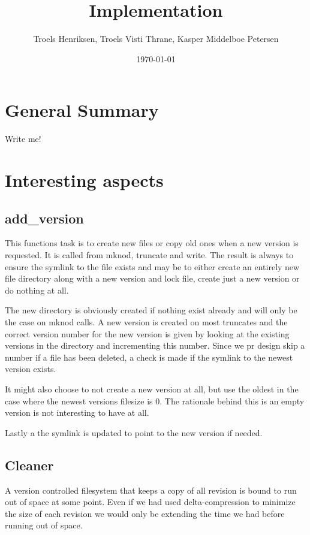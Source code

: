 \documentclass[12pt]{article}
\author{
        Troels Henriksen, Troels Visti Thrane, Kasper Middelboe Petersen
}
\date{\today}
\title{Implementation}
\begin{document}
 
\maketitle

\section{General Summary}
Write me!

\section{Interesting aspects}

\subsection{add\_version}

This functions task is to create new files or copy old ones when a new
version is requested. It is called from mknod, truncate and write. The
result is always to ensure the symlink to the file exists and may be
to either create an entirely new file directory along with a new
version and lock file, create just a new version or do nothing at all.

The new directory is obviously created if nothing exist already and
will only be the case on mknod calls. A new version is created on most
truncates and the correct version number for the new version is given
by looking at the existing versions in the directory and incrementing
this number. Since we pr design skip a number if a file has been
deleted, a check is made if the symlink to the newest version exists.

It might also choose to not create a new version at all, but use the
oldest in the case where the newest versions filesize is 0. The
rationale behind this is an empty version is not interesting to have
at all.

Lastly a the symlink is updated to point to the new version if needed.

\subsection{Cleaner}

A version controlled filesystem that keeps a copy of all revision is bound to
run out of space at some point. Even if we had used delta-compression to
minimize the size of each revision we would only be extending the time we had
before running out of space.
\end{document}
